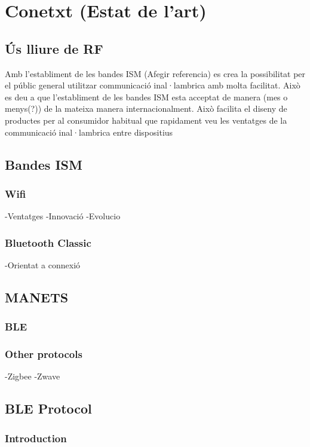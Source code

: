 \chapter{Conetxt (Estat de l'art)}\label{C:compaginacio}

\section{Ús lliure de RF}
Amb l'establiment de les bandes ISM (Afegir referencia) es crea la possibilitat per el públic general utilitzar communicació inal·lambrica amb molta facilitat. Això es deu a que l'establiment de les bandes ISM esta acceptat de manera (mes o menys(?)) de la mateixa manera internacionalment.
Això facilita el diseny de productes per al consumidor habitual que rapidament veu les ventatges de la communicació inal·lambrica entre dispositius

\section{Bandes ISM}

\subsection{Wifi}
-Ventatges
-Innovació
-Evolucio

\subsection{Bluetooth Classic}
-Orientat a connexió



\section{MANETS}

\subsection{BLE}

\subsection{Other protocols}
-Zigbee
-Zwave


\section{BLE Protocol}
\subsection{Introduction}
